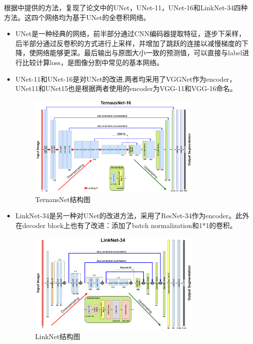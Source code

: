 \documentclass[UTF8]{ctexart}
\begin{document}
根据\cite{shvets2018automatic}中提供的方法，复现了论文中的UNet，UNet-11，UNet-16和LinkNet-34四种方法。这四个网络均为基于UNet的全卷积网络。
\begin{itemize}
    \item UNet是一种经典的网络，前半部分通过CNN编码器提取特征，逐步下采样，后半部分通过反卷积的方式进行上采样，并增加了跳跃的连接以减慢梯度的下降，使网络能够更深。最后输出与原图大小一致的预测值，可以直接与label进行比较计算loss，是图像分割中常见的基本网络。
    \item UNet-11和UNet-16是对UNet的改进,两者均采用了VGGNet作为encoder，UNet11和UNet15也是根据两者使用的encoder为VGG-11和VGG-16命名。
    \begin{figure}[H]
        \centering  %
        \includegraphics[width=0.8\textwidth]{figure/TernausNet.png}
        \caption{TernausNet结构图}
    \end{figure}
    \item LinkNet-34是另一种对UNet的改进方法，采用了ResNet-34作为encoder。此外在decoder block上也有了改进：添加了batch normalization和1*1的卷积。
    \begin{figure}[H]
        \centering  %
        \includegraphics[width=0.8\textwidth]{figure/LinkNet34.png}
        \caption{LinkNet结构图}
    \end{figure}
\end{itemize}
\end{document}

